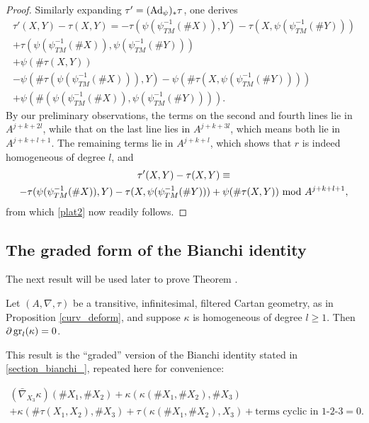\documentclass[leqno,12pt]{amsart} %
\begin{document}
\begin{proof}
  Similarly expanding $\tau'=(\operatorname{Ad}_\psi)_*\tau$, one derives
  \begin{multline}
    \tau'(X, Y) - \tau(X, Y) = -\tau(\psi(\psi_{TM}^{-1}(\#X)), Y) -
    \tau(X, \psi(\psi_{TM}^{-1}(\#Y)))\\
    + \tau(\psi(\psi_{TM}^{-1}(\#X)), \psi(\psi_{TM}^{-1}(\#Y)))\\
    + \psi(\# \tau(X, Y))\\
    - \psi(\#\tau(\psi(\psi_{TM}^{-1}(\#X))), Y) - \psi(\#\tau(X, \psi(\psi_{TM}^{-1}(\#Y))))\\
    + \psi(\#(\psi(\psi_{TM}^{-1}(\#X)), \psi(\psi_{TM}^{-1}(\#Y)))).
  \end{multline}
  By our preliminary observations, the terms on the second and fourth lines lie in
  $A^{j+k+2l}$, while that on the last line lies in $A^{j+k+3l}$, which means both lie in
  $A^{j+k+l +1}$. The remaining terms lie in $A^{j+k+l}$, which shows that $r$ is indeed
  homogeneous of degree $l$, and
  \begin{multline*}
    \tau'(X, Y) - \tau(X, Y) \equiv \\
      -\tau(\psi(\psi_{TM}^{-1}(\#X)), Y) -
      \tau(X, \psi(\psi_{TM}^{-1}(\#Y))) +  \psi(\#\tau(X, Y))
    ~\mathrm{mod}~ A^{j+k+l+1},
  \end{multline*}
  from which \eqref{plat2} now readily follows.
\end{proof}

\subsection{The graded form of the Bianchi identity}\label{section_bianchi}
The next result will be used later to prove Theorem .
\begin{proposition}
  Let $(A, \nabla, \tau)$ be a transitive, infinitesimal, filtered Cartan geometry, as in
  Proposition \ref{curv_deform}, and suppose $\kappa $ is homogeneous of degree $l \ge
  1$. Then $\partial \operatorname{\operatorname{gr}}_l(\kappa) = 0$.
\end{proposition}
\noindent%
This result is the ``graded'' version of the Bianchi identity stated in
\ref{section_bianchi_}, repeated here for convenience:

\begin{multline}
  \label{bianchi_}
  (\bar\nabla_{X_3}\kappa)(\#X_1, \#X_2) + \kappa (\kappa (\#X_1, \#X_2), \#X_3) \\
  + \kappa(\# \tau(X_1, X_2), \#X_3) + \tau(\kappa(\#X_1, \#X_2), X_3) +
  \text{terms cyclic in 1-2-3} = 0.
 \end{multline}
\end{document}
